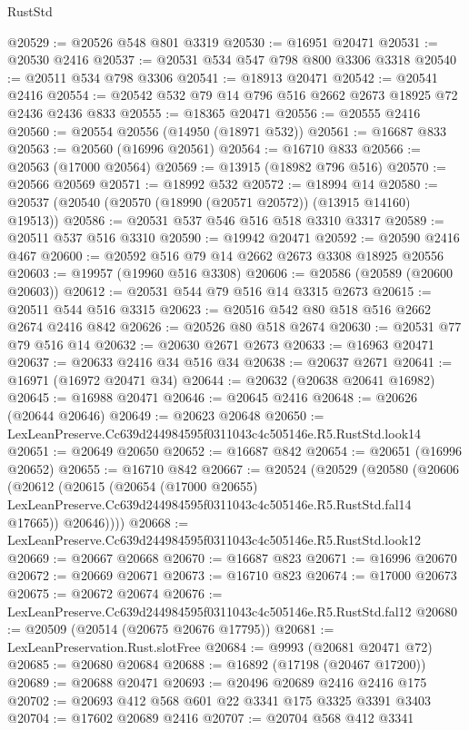 \begin{lexlean}{RustStd}
\begin{coremodule}
@20529 := @20526 @548 @801 @3319
@20530 := @16951 @20471
@20531 := @20530 @2416
@20537 := @20531 @534 @547 @798 @800 @3306 @3318
@20540 := @20511 @534 @798 @3306
@20541 := @18913 @20471
@20542 := @20541 @2416
@20554 := @20542 @532 @79 @14 @796 @516 @2662 @2673 @18925 @72 @2436 @2436 @833
@20555 := @18365 @20471
@20556 := @20555 @2416
@20560 := @20554 @20556 (@14950 (@18971 @532))
@20561 := @16687 @833
@20563 := @20560 (@16996 @20561)
@20564 := @16710 @833
@20566 := @20563 (@17000 @20564)
@20569 := @13915 (@18982 @796 @516)
@20570 := @20566 @20569
@20571 := @18992 @532
@20572 := @18994 @14
@20580 := @20537 (@20540 (@20570 (@18990 (@20571 @20572)) (@13915 @14160) @19513))
@20586 := @20531 @537 @546 @516 @518 @3310 @3317
@20589 := @20511 @537 @516 @3310
@20590 := @19942 @20471
@20592 := @20590 @2416 @467
@20600 := @20592 @516 @79 @14 @2662 @2673 @3308 @18925 @20556
@20603 := @19957 (@19960 @516 @3308)
@20606 := @20586 (@20589 (@20600 @20603))
@20612 := @20531 @544 @79 @516 @14 @3315 @2673
@20615 := @20511 @544 @516 @3315
@20623 := @20516 @542 @80 @518 @516 @2662 @2674 @2416 @842
@20626 := @20526 @80 @518 @2674
@20630 := @20531 @77 @79 @516 @14
@20632 := @20630 @2671 @2673
@20633 := @16963 @20471
@20637 := @20633 @2416 @34 @516 @34
@20638 := @20637 @2671
@20641 := @16971 (@16972 @20471 @34)
@20644 := @20632 (@20638 @20641 @16982)
@20645 := @16988 @20471
@20646 := @20645 @2416
@20648 := @20626 (@20644 @20646)
@20649 := @20623 @20648
@20650 := LexLeanPreserve.Cc639d244984595f0311043c4c505146e.R5.RustStd.look14
@20651 := @20649 @20650
@20652 := @16687 @842
@20654 := @20651 (@16996 @20652)
@20655 := @16710 @842
@20667 := @20524
    (@20529
      (@20580
        (@20606
          (@20612
            (@20615
              (@20654
                (@17000 @20655)
                LexLeanPreserve.Cc639d244984595f0311043c4c505146e.R5.RustStd.fal14
                @17665))
            @20646))))
@20668 := LexLeanPreserve.Cc639d244984595f0311043c4c505146e.R5.RustStd.look12
@20669 := @20667 @20668
@20670 := @16687 @823
@20671 := @16996 @20670
@20672 := @20669 @20671
@20673 := @16710 @823
@20674 := @17000 @20673
@20675 := @20672 @20674
@20676 := LexLeanPreserve.Cc639d244984595f0311043c4c505146e.R5.RustStd.fal12
@20680 := @20509 (@20514 (@20675 @20676 @17795))
@20681 := LexLeanPreservation.Rust.slotFree
@20684 := @9993 (@20681 @20471 @72)
@20685 := @20680 @20684
@20688 := @16892 (@17198 (@20467 @17200))
@20689 := @20688 @20471
@20693 := @20496 @20689 @2416 @2416 @175
@20702 := @20693 @412 @568 @601 @22 @3341 @175 @3325 @3391 @3403
@20704 := @17602 @20689 @2416
@20707 := @20704 @568 @412 @3341

\end{coremodule}
\end{lexlean}
